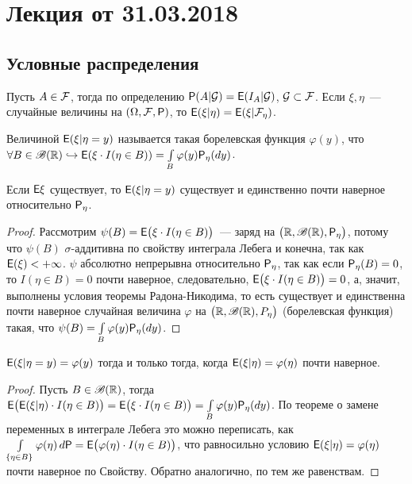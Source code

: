 \section{Лекция от 31.03.2018}
 \subsection{Условные распределения}
 \begin{definition}
 	Пусть $A \in \F$, тогда по определению $\P(A | \G) = \E( I_A | \G)$, $\G \subset \F$. Если $\xi, \eta$~--- случайные величины на $(\Omega, \F, \P)$, то $\E(\xi | \eta) = \E(\xi | \F_\eta)$.
 \end{definition}
 \begin{definition}
 	Величиной $\E (\xi | \eta = y)$ называется такая борелевская функция $\varphi(y)$, 
 	что $\forall B \in \B(\R) \hookrightarrow \E(\xi \cdot I(\eta \in B)) = 
 	\int\limits_B \varphi(y) \P_\eta (d y)$.
 \end{definition}
 \begin{lemma}
 	Если $\E \xi$ существует, то $\E( \xi | \eta = y)$ существует и единственно почти 
 	наверное относительно $\P_\eta$.
 	\begin{proof}
 		Рассмотрим $\psi(B) = \E \big( \xi \cdot I (\eta \in B) \big)$~--- заряд на 
 		$\big( \R, \B(\R), \P_\eta \big)$, потому что $\psi(B)$ $\sigma$-аддитивна по
 		 свойству интеграла Лебега и конечна, так как $\E(\xi) < +\infty$. 
 		 $\psi$ абсолютно непрерывна относительно $\P_\eta$, так как если 
 		 $\P_\eta(B) = 0$, то $I(\eta \in B) = 0$ почти наверное, следовательно, 
 		 $\E \big( \xi \cdot I (\eta \in B) \big) = 0$, а, значит, выполнены условия 
 		 теоремы Радона-Никодима, то есть существует и единственна почти наверное 
 		 случайная величина $\varphi$ на $\big( \R, \B(\R), P_\eta \big)$ 
 		 (борелевская функция) такая, что 
 		 $\psi(B) = \int\limits_B \varphi(y) \P_\eta(dy)$.
 	\end{proof}
 \end{lemma}
 \begin{lemma}
 	$\E ( \xi | \eta = y) = \varphi(y)$ тогда и только тогда, когда 
 	$\E(\xi | \eta) = \varphi(\eta)$ почти наверное.
 	\begin{proof}
 		Пусть $B \in \B(\R)$, тогда 
 		$\E \big( \E(\xi | \eta) \cdot I (\eta \in B) \big) = 
 		\E \big( \xi \cdot I(\eta \in B) \big) = \int\limits_B \varphi(y) \P_\eta(d y)$. 
 		По теореме о замене переменных в интеграле Лебега это можно переписать, как 
 		$\int\limits_{\{\eta \in B \}} \varphi(\eta) \, d \P = 
 		\E \big( \varphi(\eta) \cdot I (\eta \in B) \big)$, 
 		что равносильно условию $\E(\xi | \eta) = \varphi(\eta)$ 
 		почти наверное по Свойству. Обратно аналогично, по тем же равенствам.
 	\end{proof}
 \end{lemma}
